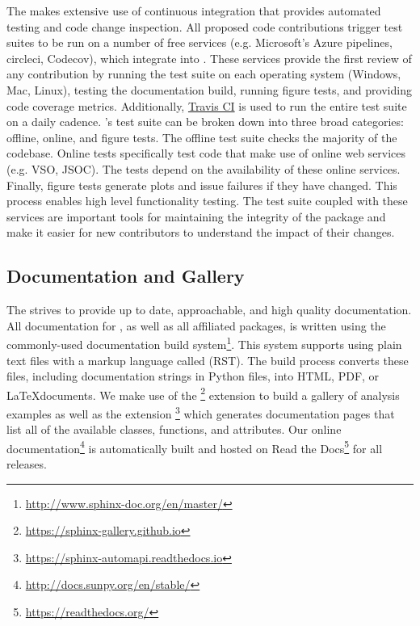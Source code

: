 The \sunpyproj makes extensive use of continuous integration that provides automated testing and code change inspection.
All proposed code contributions trigger test suites to be run on a number of free services (e.g.
Microsoft's Azure pipelines, circleci, Codecov), which integrate into \github.
These services provide the first review of any contribution by running the test suite on each operating system (Windows, Mac, Linux), testing the documentation build, running figure tests, and providing code coverage metrics.
Additionally, \href{https://travis-ci.org}{Travis CI} is used to run the entire test suite on a daily cadence.
\sunpypkg's test suite can be broken down into three broad categories: offline, online, and figure tests.
The offline test suite checks the majority of the codebase.
Online tests specifically test code that make use of online web services (e.g. VSO, JSOC).
The tests depend on the availability of these online services.
Finally, figure tests generate plots and issue failures if they have changed.
This process enables high level functionality testing.
The \sunpypkg test suite coupled with these services are important tools for maintaining the integrity of the package and make it easier for new contributors to understand the impact of their changes.

\subsection{Documentation and Gallery}
\label{sec:docs}

The \sunpyproj strives to provide up to date, approachable, and high quality documentation.
All documentation for \sunpypkg, as well as all affiliated packages, is written using the commonly-used  documentation build system\footnote{\url{http://www.sphinx-doc.org/en/master/}}.
This system supports using plain text files with a markup language called  (RST).
The build process converts these files, including documentation strings in Python files, into HTML, PDF, or \LaTeX documents.
We make use of the \footnote{\url{https://sphinx-gallery.github.io}} extension to build a gallery of analysis examples as well as the extension \footnote{\url{https://sphinx-automapi.readthedocs.io}} which generates documentation pages that list all of the available classes, functions, and attributes.
Our online documentation\footnote{\url{http://docs.sunpy.org/en/stable/}} is automatically built and hosted on Read the Docs\footnote{\url{https://readthedocs.org/}} for all releases.
